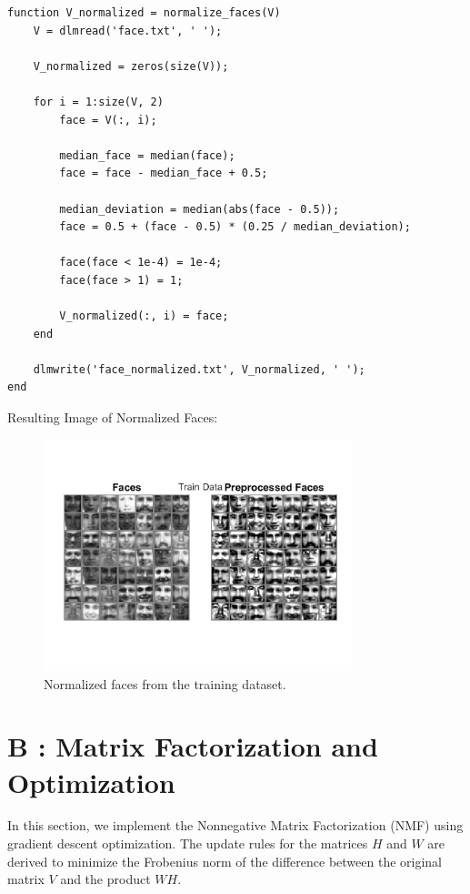 \documentclass[journal,12pt,onecolumn,draftclsnofoot]{IEEEtran}
\begin{document}
\begin{lstlisting}
function V_normalized = normalize_faces(V)
    V = dlmread('face.txt', ' ');
    
    V_normalized = zeros(size(V));
    
    for i = 1:size(V, 2)
        face = V(:, i);
        
        median_face = median(face);
        face = face - median_face + 0.5;
        
        median_deviation = median(abs(face - 0.5));
        face = 0.5 + (face - 0.5) * (0.25 / median_deviation);
        
        face(face < 1e-4) = 1e-4;
        face(face > 1) = 1;
        
        V_normalized(:, i) = face;
    end
    
    dlmwrite('face_normalized.txt', V_normalized, ' ');
end
\end{lstlisting}
\par

Resulting Image of Normalized Faces:

\begin{figure}[h]
    \centering
    \includegraphics[width=0.8\textwidth]{images/TrainData.jpeg}
    \caption{Normalized faces from the training dataset.}
    \label{fig:normalized_faces}
\end{figure}




\section*{B : Matrix Factorization and Optimization}

In this section, we implement the Nonnegative Matrix Factorization (NMF) using gradient descent optimization. The update rules for the matrices $H$ and $W$ are derived to minimize the Frobenius norm of the difference between the original matrix $V$ and the product $WH$. 
\end{document}
